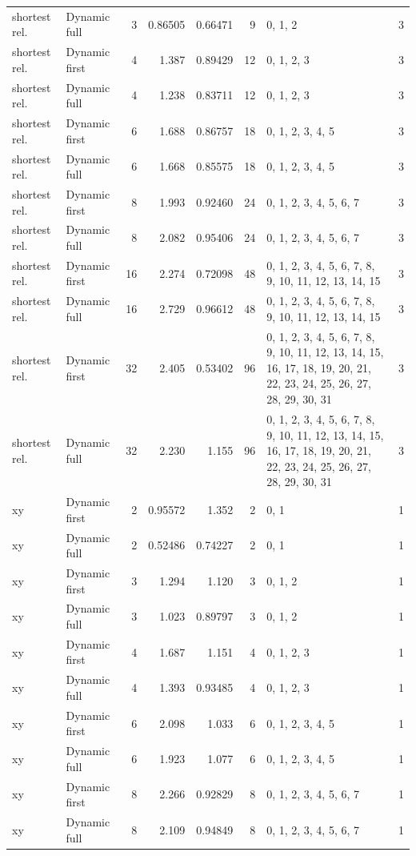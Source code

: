 \documentclass[10pt,a4paper]{article}
\begin{document}
\begin{longtable}{@{}p{23mm}p{29mm}rrrrp{36mm}r@{}}
shortest rel. & Dynamic full & 3 & 0.86505 & 0.66471 & 9 & 0, 1, 2 & 3 \\
shortest rel. & Dynamic first & 4 & 1.387 & 0.89429 & 12 & 0, 1, 2, 3 & 3 \\
shortest rel. & Dynamic full & 4 & 1.238 & 0.83711 & 12 & 0, 1, 2, 3 & 3 \\
shortest rel. & Dynamic first & 6 & 1.688 & 0.86757 & 18 & 0, 1, 2, 3, 4, 5 & 3 \\
shortest rel. & Dynamic full & 6 & 1.668 & 0.85575 & 18 & 0, 1, 2, 3, 4, 5 & 3 \\
shortest rel. & Dynamic first & 8 & 1.993 & 0.92460 & 24 & 0, 1, 2, 3, 4, 5, 6, 7 & 3 \\
shortest rel. & Dynamic full & 8 & 2.082 & 0.95406 & 24 & 0, 1, 2, 3, 4, 5, 6, 7 & 3 \\
shortest rel. & Dynamic first & 16 & 2.274 & 0.72098 & 48 & 0, 1, 2, 3, 4, 5, 6, 7, 8, 9, 10, 11, 12, 13, 14, 15 & 3 \\
shortest rel. & Dynamic full & 16 & 2.729 & 0.96612 & 48 & 0, 1, 2, 3, 4, 5, 6, 7, 8, 9, 10, 11, 12, 13, 14, 15 & 3 \\
shortest rel. & Dynamic first & 32 & 2.405 & 0.53402 & 96 & 0, 1, 2, 3, 4, 5, 6, 7, 8, 9, 10, 11, 12, 13, 14, 15, 16, 17, 18, 19, 20, 21, 22, 23, 24, 25, 26, 27, 28, 29, 30, 31 & 3 \\
shortest rel. & Dynamic full & 32 & 2.230 & 1.155 & 96 & 0, 1, 2, 3, 4, 5, 6, 7, 8, 9, 10, 11, 12, 13, 14, 15, 16, 17, 18, 19, 20, 21, 22, 23, 24, 25, 26, 27, 28, 29, 30, 31 & 3 \\
xy & Dynamic first & 2 & 0.95572 & 1.352 & 2 & 0, 1 & 1 \\
xy & Dynamic full & 2 & 0.52486 & 0.74227 & 2 & 0, 1 & 1 \\
xy & Dynamic first & 3 & 1.294 & 1.120 & 3 & 0, 1, 2 & 1 \\
xy & Dynamic full & 3 & 1.023 & 0.89797 & 3 & 0, 1, 2 & 1 \\
xy & Dynamic first & 4 & 1.687 & 1.151 & 4 & 0, 1, 2, 3 & 1 \\
xy & Dynamic full & 4 & 1.393 & 0.93485 & 4 & 0, 1, 2, 3 & 1 \\
xy & Dynamic first & 6 & 2.098 & 1.033 & 6 & 0, 1, 2, 3, 4, 5 & 1 \\
xy & Dynamic full & 6 & 1.923 & 1.077 & 6 & 0, 1, 2, 3, 4, 5 & 1 \\
xy & Dynamic first & 8 & 2.266 & 0.92829 & 8 & 0, 1, 2, 3, 4, 5, 6, 7 & 1 \\
xy & Dynamic full & 8 & 2.109 & 0.94849 & 8 & 0, 1, 2, 3, 4, 5, 6, 7 & 1 \\

\end{longtable}
\end{document}
